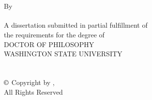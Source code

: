 \label{chap:title}

\begin{titlepage}
 	\begin{singlespace}
   		\begin{center}
			\MakeUppercase{\mytitleA}\\
			\bigskip
			\MakeUppercase{\mytitleB}\\
			\vspace{1.31in}
			By\\
			\bigskip
			{\MakeUppercase{\myname}}\\
			\vspace{2.65in}
			A dissertation submitted in partial fulfillment of\\
			the requirements for the degree of\\
      		\bigskip
      		\uppercase{Doctor of Philosophy}\\
      		\bigskip \bigskip \bigskip
      		\uppercase{Washington State University}\\
      		\mydepartment\\
      		\bigskip
     		\uppercase{\MakeUppercase{} \currentyear}\\
      		\bigskip \bigskip
      		$\copyright$ Copyright by \MakeUppercase{\myname}, \currentyear\\
      		All Rights Reserved
		\end{center}
	\end{singlespace}
\end{titlepage}

\newpage
